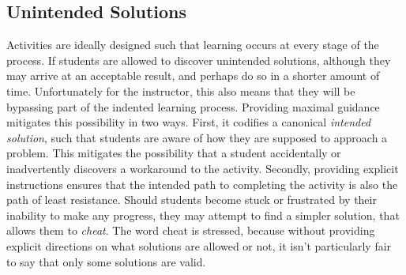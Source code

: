     \subsection{Unintended Solutions}
        Activities are ideally designed such that learning occurs at every stage of the process. %
If students are allowed to discover unintended solutions, although they may arrive at an acceptable result, and perhaps do so in a shorter amount of time. %
Unfortunately for the instructor, this also means that they will be bypassing part of the indented learning process. %
Providing maximal guidance mitigates this possibility in two ways. %
First, it codifies a canonical \emph{intended solution}, such that students are aware of how they are supposed to approach a problem. %
This mitigates the possibility that a student accidentally or inadvertently discovers a workaround to the activity. %
Secondly, providing explicit instructions ensures that the intended path to completing the activity is also the path of least resistance. %
Should students become stuck or frustrated by their inability to make any progress, they may attempt to find a simpler solution, that allows them to \emph{cheat}. %
The word cheat is stressed, because without providing explicit directions on what solutions are allowed or not, it isn't particularly fair to say that only some solutions are valid. 

        
    

        

